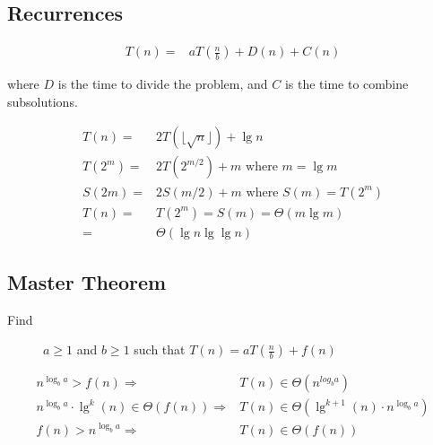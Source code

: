 \documentclass[landscape]{cheat}
\begin{document}
\begin{multicols*}{3}
\section{Recurrences}


\begin{align*}
    T(n) =& aT(\frac{n}{b}) + D(n) + C(n)
\end{align*}

where $D$ is the time to divide the problem, and $C$ is the time to combine subsolutions.


\begin{align*}
    T(n) =& 2T(\lfloor \sqrt{n} \rfloor) + \lg n\\
    T(2^m) =& 2T(2^{m/2}) + m \text{ where } m = \lg m\\
    S(2m) =& 2S(m / 2) + m \text{ where } S(m) = T(2^m)\\
    T(n) =& T(2^m) = S(m) = \Theta(m \lg m)\\
        =& \Theta(\lg n \lg \lg n)
\end{align*}


\subsection{Master Theorem}
\begin{description}
    \item[Find] $a \geq 1$ and $b \geq 1$ such that $T(n) = a T\left(\frac n b\right) + f(n)$
\end{description}
\begin{align*}
    n^{\log_b a} > f(n) \Rightarrow& T(n) \in \Theta(n^{log_b a}) \\
    n^{\log_b a} \cdot \lg^k(n) \in \Theta(f(n)) \Rightarrow& T(n) \in \Theta(\lg^{k+1}(n) \cdot n^{\log_b a}) \\
    f(n) > n^{\log_b a} \Rightarrow& T(n) \in \Theta(f(n)) \\
\end{align*}


\end{multicols*}
\end{document}
